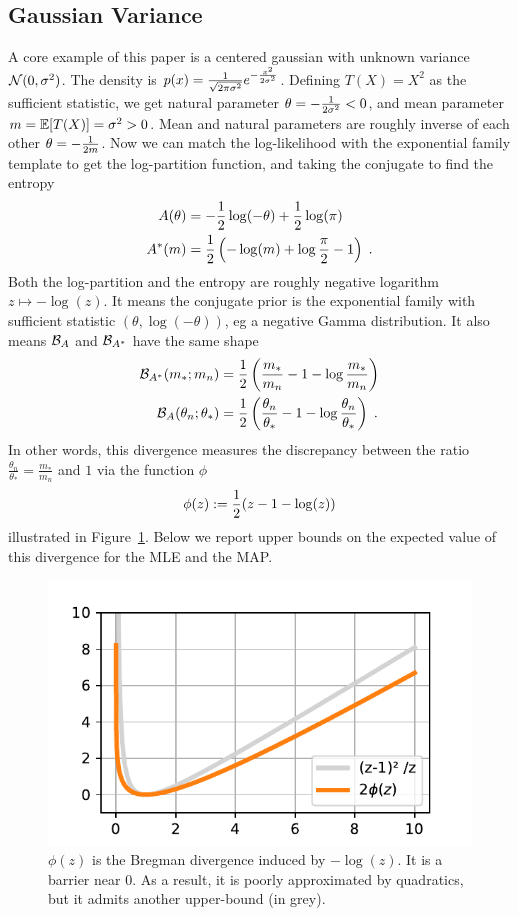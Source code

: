 \documentclass[twoside]{article}
\newcommand{\logpart}{A}
\newcommand{\conj}{\logpart^*}
\newcommand{\bregman}{\cB_\logpart}
\newcommand{\bregmanconj}{\cB_{\logpart^*}}
\newcommand{\nat}{\theta}
\newcommand{\m}{m}
\begin{document}
\subsection{Gaussian Variance}
A core example of this paper is a centered gaussian with unknown variance ${\mathcal N}(0,\sigma^2)$. 
The density is	$p(x) = \frac{1}{\sqrt{2\pi \sigma^2}} e^{-\frac{x^2}{2 \sigma^2}}$.
Defining $T(X)=X^2$ as the sufficient statistic, we get natural parameter $\nat = -\inv{2 \sigma^2} <0$, and mean parameter $\m=\E[T(X)] = \sigma^2 >0$. 
Mean and natural parameters are roughly inverse of each other $\nat = -\inv{2 \m}$.
Now we can match the log-likelihood with the exponential family template to get the log-partition function, and taking the conjugate to find the entropy
\begin{align}
	\logpart (\nat) &= - \half \log(-\nat)  + \half \log(\pi) \\
	\conj(\m) &= \half\left( -\log(\m) + \log\frac{\pi}{2} - 1 \right) \; .
\end{align}
Both the log-partition and  the entropy are roughly negative logarithm $z\mapsto - \log(z)$.
It means the conjugate prior is the exponential family with sufficient statistic $(\nat, \log(-\nat) )$, eg a negative Gamma distribution.
It also means $\bregman$ and $\bregmanconj$ have the same shape
\begin{align}
	\bregmanconj( \m_*; \m_n) 
	&= \half \left ( \frac{\m_*}{ \m_n} - 1 - \log  \frac{\m_*}{ \m_n} \right) \\
	\bregman( \nat_n; \nat_* )
	&=  \half \left ( \frac{ \nat_n}{\nat_*} - 1 - \log  \frac{ \nat_n}{\nat_*} \right) \; .
\end{align}
In other words, this divergence measures the discrepancy between the ratio $\frac{ \nat_n}{\nat_*} =  \frac{\m_*}{ \m_n}  $ and $1$ via the function $\phi$
\begin{align}
	\phi(z) := \frac{1}{2} (z - 1 - \log(z))
\end{align}
illustrated in Figure~\ref{fig:phi}. 
Below we report upper bounds on the expected value of this divergence for the MLE and the MAP.


\begin{figure}[ht]
	\centering
	\includegraphics[width=.4\textwidth]{phi.pdf}
	\caption{$\phi(z)$ is the Bregman divergence induced by $-\log(z)$. It is a barrier near $0$. As a result, it is poorly approximated by quadratics, but it admits another upper-bound (in grey).}
	\label{fig:phi}
\end{figure}
\end{document}
